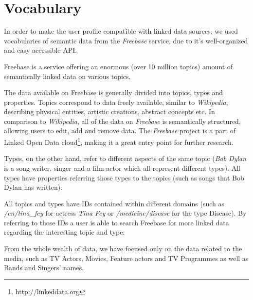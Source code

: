 \section{Vocabulary}

In order to make the user profile compatible with linked data sources, we used
vocabularies of semantic data from the \textit{Freebase} service, due to it's
well-organized and easy accessible API.

Freebase is a service offering an enormous (over 10 million topics) amount of semantically linked data on various topics.

The data available on Freebase is generally divided into topics, types and properties. Topics correspond to data freely
available, similar to \textit{Wikipedia}, describing physical entities, artistic creations, abstract concepts etc. In comparison
to \textit{Wikipedia}, all of the data on \textit{Freebase} is semantically structured, allowing users to edit, add and remove data. The \textit{Freebase} project is a part of Linked Open Data cloud\footnote{http://linkeddata.org}, making it a great
entry point for further research.

Types, on the other hand, refer to different aspects of the same topic (\eg \textit{Bob Dylan} is a song writer,
singer and a film actor which all represent different types). All types have properties referring those
types to the topics (such as songs that Bob Dylan has written).

All topics and types have IDs contained within different domains (such as \textit{/en/tina\_fey} for actress \textit{Tina Fey}
or \textit{/medicine/disease} for the type Disease). By referring to those IDs a user is able to search Freebase for
more linked data regarding the interesting topic and type.

From the whole wealth of data, we have focused only on the data related to the media, such as TV Actors, Movies, Feature
actors and TV Programmes as well as Bands and Singers' names.